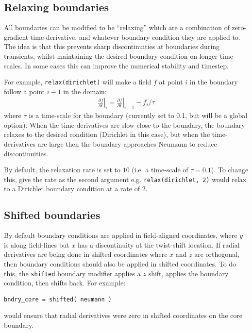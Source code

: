 \documentclass[12pt]{article}
\newcommand{\code}[1]{\texttt{#1}}
\def\L{\left}
\def\R{\right}
\newcommand{\deriv}[2]{\ensuremath{\frac{\partial #1}{\partial #2}}}
\begin{document}
\subsection{Relaxing boundaries}
%
All boundaries can be modified to be ``relaxing'' which are a combination of
zero-gradient time-derivative, and whatever boundary condition they are applied
to. The idea is that this prevents sharp discontinuities at boundaries during
transients, whilst maintaining the desired boundary condition on longer
time-scales. In some cases this can improve the numerical stability and
timestep.

For example, \code{relax(dirichlet)} will make a field $f$ at point $i$ in the
boundary follow a point $i-1$ in the domain:
%
\begin{align}
\L.\deriv{f}{t}\R|_i = \L.\deriv{f}{t}\R|_{i-1}  - f_i / \tau
\end{align}
%
where $\tau$ is a time-scale for the boundary (currently set to 0.1, but will
be a global option).  When the time-derivatives are slow close to the boundary,
the boundary relaxes to the desired condition (Dirichlet in this case), but
when the time-derivatives are large then the boundary approaches Neumann to
reduce discontinuities.

By default, the relaxation rate is set to $10$ (i.e. a time-scale of
$\tau=0.1$).  To change this, give the rate as the second argument e.g.
\code{relax(dirichlet, 2)} would relax to a Dirichlet boundary condition at a
rate of $2$.



\subsection{Shifted boundaries}
%
By default boundary conditions are applied in field-aligned coordinates, where
$y$ is along field-lines but $x$ has a discontinuity at the twist-shift
location. If radial derivatives are being done in shifted coordinates where $x$
and $z$ are orthogonal, then boundary conditions should also be applied in
shifted coordinates. To do this, the \code{shifted} boundary modifier applies a
$z$ shift, applies the boundary condition, then shifts back. For example:
%
\begin{lstlisting}[numbers=none]
bndry_core = shifted( neumann )
\end{lstlisting}
%
would ensure that radial derivatives were zero in shifted coordinates on the
core boundary.
\end{document}
